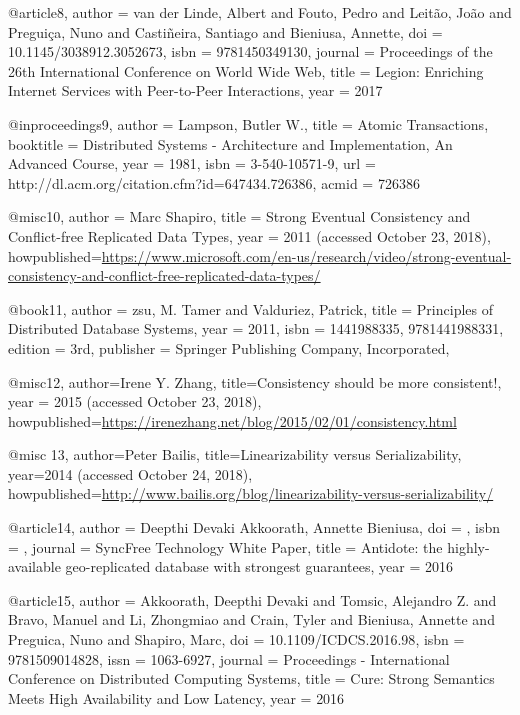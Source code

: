 @article{8,
author = {van der Linde, Albert and Fouto, Pedro and Leit{\~{a}}o, Jo{\~{a}}o and Pregui{\c{c}}a, Nuno and Casti{\~{n}}eira, Santiago and Bieniusa, Annette},
doi = {10.1145/3038912.3052673},
isbn = {9781450349130},
journal = {Proceedings of the 26th International Conference on World Wide Web},
title = {{Legion: Enriching Internet Services with Peer-to-Peer Interactions}},
year = {2017}
}

@inproceedings{9,
 author = {Lampson, Butler W.},
 title = {Atomic Transactions},
 booktitle = {Distributed Systems - Architecture and Implementation, An Advanced Course},
 year = {1981},
 isbn = {3-540-10571-9},
 url = {http://dl.acm.org/citation.cfm?id=647434.726386},
 acmid = {726386}
} 

@misc{10,
author = {Marc Shapiro},
title = {Strong Eventual Consistency and Conflict-free Replicated Data Types},
year = {2011 (accessed October 23, 2018)}, 
howpublished={\url{https://www.microsoft.com/en-us/research/video/strong-eventual-consistency-and-conflict-free-replicated-data-types/}}
} 

@book{11,
 author = {zsu, M. Tamer and Valduriez, Patrick},
 title = {Principles of Distributed Database Systems},
 year = {2011},
 isbn = {1441988335, 9781441988331},
 edition = {3rd},
 publisher = {Springer Publishing Company, Incorporated},
} 

@misc{12, 
author={Irene Y. Zhang},
title={Consistency should be more consistent!},
year = {2015 (accessed October 23, 2018)}, 
howpublished={\url{https://irenezhang.net/blog/2015/02/01/consistency.html}}
}

@misc {13,
author={Peter Bailis},
title={Linearizability versus Serializability},
year={2014 (accessed October 24, 2018)},
howpublished={\url{http://www.bailis.org/blog/linearizability-versus-serializability/}}
}

@article{14,
author = {Deepthi Devaki Akkoorath, Annette Bieniusa},
doi = {},
isbn = {},
journal = {SyncFree Technology White Paper},
title = {Antidote: the highly-available geo-replicated database with strongest guarantees},
year = {2016}
}

@article{15,
author = {Akkoorath, Deepthi Devaki and Tomsic, Alejandro Z. and Bravo, Manuel and Li, Zhongmiao and Crain, Tyler and Bieniusa, Annette and Preguica, Nuno and Shapiro, Marc},
doi = {10.1109/ICDCS.2016.98},
isbn = {9781509014828},
issn = {1063-6927},
journal = {Proceedings - International Conference on Distributed Computing Systems},
title = {{Cure: Strong Semantics Meets High Availability and Low Latency}},
year = {2016}
}

